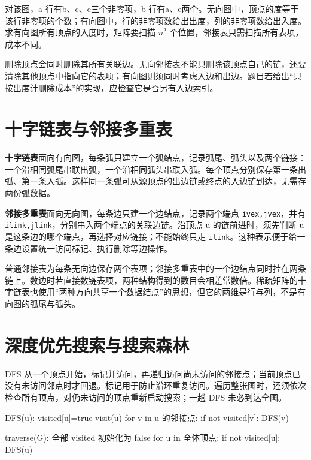 对该图，a 行有b、c、e三个非零项，b 行有a、e两个。无向图中，顶点的度等于该行非零项的个数；有向图中，行的非零项数给出出度，列的非零项数给出入度。求有向图所有顶点的入度时，矩阵要扫描 \(n^2\) 个位置，邻接表只需扫描所有表项，成本不同。

删除顶点会同时删除其所有关联边。无向邻接表不能只删除该顶点自己的链，还要清除其他顶点中指向它的表项；有向图则须同时考虑入边和出边。题目若给出``只按出度计删除成本''的实现，应检查它是否另有入边索引。

\section{十字链表与邻接多重表}\label{DS06-03}

\textbf{十字链表}面向有向图，每条弧只建立一个弧结点，记录弧尾、弧头以及两个链接：一个沿相同弧尾串联出弧，一个沿相同弧头串联入弧。每个顶点分别保存第一条出弧、第一条入弧。这样同一条弧可从源顶点的出边链或终点的入边链到达，无需存两份弧数据。

\textbf{邻接多重表}面向无向图，每条边只建一个边结点，记录两个端点 \texttt{ivex,\allowbreak{}jvex}，并有 \texttt{ilink,\allowbreak{}jlink}，分别串入两个端点的关联边链。沿顶点 u 的链前进时，须先判断 u 是这条边的哪个端点，再选择对应链接；不能始终只走 \texttt{ilink}。这种表示便于给一条边设置统一访问标记、执行删除等边操作。

普通邻接表为每条无向边保存两个表项；邻接多重表中的一个边结点同时挂在两条链上。数边时若直接数链表项，两种结构得到的数目会相差常数倍。稀疏矩阵的十字链表也使用``两种方向共享一个数据结点''的思想，但它的两维是行与列，不是有向图的弧尾与弧头。

\section{深度优先搜索与搜索森林}\label{DS06-04}

DFS 从一个顶点开始，标记并访问，再递归访问尚未访问的邻接点；当前顶点已没有未访问邻点时才回退。标记用于防止沿环重复访问。遍历整张图时，还须依次检查所有顶点，对仍未访问的顶点重新启动搜索；一趟 DFS 未必到达全图。

\begin{codeblock}[language={}]
DFS(u):
    visited[u]=true
    visit(u)
    for v in u 的邻接点:
        if not visited[v]: DFS(v)

traverse(G):
    全部 visited 初始化为 false
    for u in 全体顶点:
        if not visited[u]: DFS(u)
\end{codeblock}

